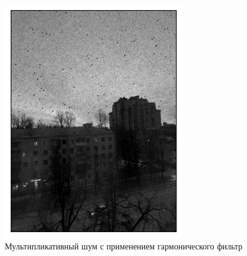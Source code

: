 \documentclass[a4paper,12pt]{article}
\begin{document}
\begin{figure}[H]
\begin{minipage}{0.49\textwidth}
        \centering \includegraphics[width=\textwidth]{results/lpf_speckle_3.png}
        \caption{Мультипликативный шум с применением гармонического фильтр}
    \end{minipage}
\end{figure}
\end{document}
